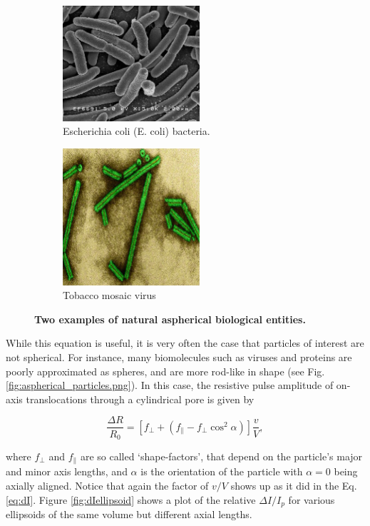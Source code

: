		\begin{figure}[t!]
			\centering
			\begin{subfigure}[t]{0.5\textwidth}
				\centering
				\includegraphics[width=2in]{ecoli.jpg}
				\caption{Escherichia coli (E. coli) bacteria.}
			\end{subfigure}
			\begin{subfigure}[t]{0.5\textwidth}
				\centering
				\includegraphics[width=2in]{tobaccomosaicvirus.png}
				\caption{Tobacco mosaic virus}
			\end{subfigure}
			\caption{\textbf{Two examples of natural aspherical biological entities.}}
		\end{figure}
		
		While this equation is useful, it is very often the case that particles of interest are not spherical. For instance, many biomolecules such as viruses and proteins are poorly approximated as spheres, and are more rod-like in shape (see Fig. \ref{fig:aspherical_particles.png}). In this case, the resistive pulse amplitude of on-axis translocations through a cylindrical pore is given by 
		
		\begin{equation}\label{eq:dIellipsoid}
			\frac{\Delta R}{R_{0}}=\left[f_{\perp}+\left(f_{\parallel}-f_{\perp}\cos^{2}\alpha\right)\right]\frac{v}{V},
		\end{equation}

		where $f_{\perp}$ and $f_{\parallel}$ are so called `shape-factors', that depend on the particle's major and minor axis lengths, and $\alpha$ is the orientation of the particle with $\alpha=0$ being axially aligned. Notice that again the factor of $v/V$ shows up as it did in the Eq. \ref{eq:dI}. Figure \ref{fig:dIellipsoid} shows a plot of the relative $\Delta I/I_{p}$ for various ellipsoids of the same volume but different axial lengths.
		
